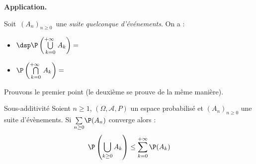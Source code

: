 \documentclass[a4paper,10pt]{report}
\newcommand{\Sum}[2]{\ensuremath{\textstyle{\sum\limits_{#1}^{#2}}}}
\begin{document}
\begin{enumerate}
\medskip

%
%
 
\textbf{Application.}

Soit $\,(A_n)_{n \geq 0}\,$ une \emph{suite quelconque d'événements}. On a :
\begin{itemize}
\item $\dsp\P \left(\bigcup\limits_{k=0}^{+\infty\ } A_k\right) = \phantom{
\lim\limits_{n\to+\infty}\!\!\P\left(\bigcup\limits_{k=0}^{n} A_k\right) 
\quad}$ 
\item $\P \left(\bigcap\limits_{k=0}^{+\infty\ } A_k\right) = 
\phantom{\lim\limits_{n\to+\infty}\!\!\P\left(\bigcap\limits_{k=0}^{n} A_k\right)} $
\end{itemize}

\medskip

Prouvons le premier point (le deuxième se prouve de la même manière).

\vspace{7cm}


\begin{Theoreme}{Sous-additivité}
Soient $n \geq 1$, $(\Omega,\mathcal{A},P)$ un espace probabilisé et $(A_n)_{n \geq 0}$ une suite d'évènements. Si $\Sum{n \geq 0}{} \P(A_n)$ converge alors :
$$ \P \left(\bigcup_{k \geq 0} A_k \right) \leq \sum_{k=0}^{+ \infty} \P(A_k)$$
\end{Theoreme}

\begin{Demonstration}{}


\end{Demonstration}
\end{enumerate}
\end{document}
